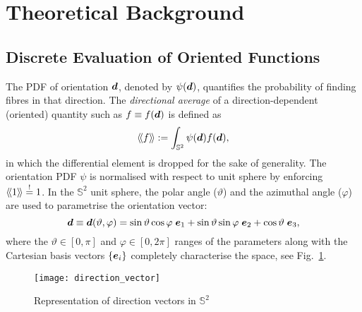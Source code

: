 \section{Theoretical Background}	
\subsection{Discrete Evaluation of Oriented Functions}	
	The PDF of orientation $\tena{d}$, denoted by $\psi(\tena{d})$, quantifies the probability of finding fibres in that direction. The \textit{directional average} of a direction-dependent (oriented) quantity such as $f\equiv f(\tena{d})$ is defined as~\autocite{Hashlamoun.2017}
	\begin{equation}\label{eq:odist}
		\averot{f} \equidef \int_{\mathbb{S}^2} \psi(\tena{d}) f(\tena{d}),
	\end{equation}
	in which the differential element is dropped for the sake of generality. The orientation PDF $\psi$ is normalised with respect to unit sphere by enforcing $\langle\!\langle 1\rangle\!\rangle\stackrel{\mathrm{!}}{=} 1$. In the $\mathbb{S}^2$ unit sphere, the polar angle ($\vartheta$) and the azimuthal angle ($\varphi$) are used to parametrise the orientation vector:
	\begin{equation}
		\tena{d}\equiv\tena{d}(\vartheta,\varphi) = \sin\vartheta\cos\varphi\;\base_1+\sin\vartheta\sin\varphi\;\base_2+\cos\vartheta\;\base_3,
	\end{equation}
	where the $\vartheta\in \left[0,\pi\right]$ and $\varphi\in\left[0,2\pi\right]$ ranges of the parameters along with the Cartesian basis vectors $\{\base_i\}$ completely characterise the space, see Fig.~\ref{fig:direction_vector}.

\begin{figure}[!h]{}
  	\centering
  	\texttt{[image: direction\_vector]}
	\caption{Representation of direction vectors in $\mathbb{S}^2$}
	\label{fig:direction_vector}
\end{figure}%



